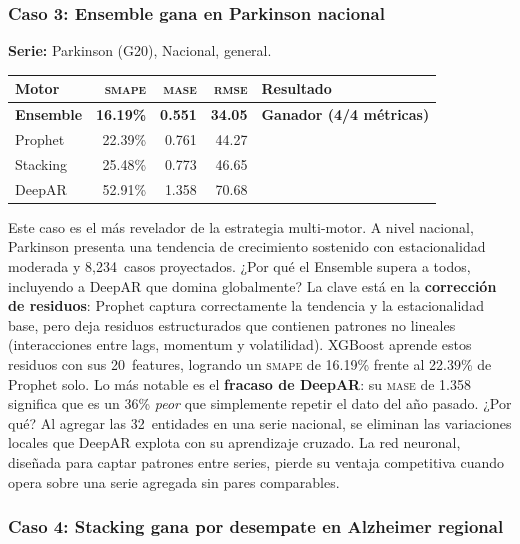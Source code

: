 \documentclass[12pt, letterpaper]{article}
\newcommand{\smape}{\textnormal{\textsc{smape}}}
\newcommand{\mase}{\textnormal{\textsc{mase}}}
\newcommand{\rmse}{\textnormal{\textsc{rmse}}}
\begin{document}
\subsubsection{Caso 3: Ensemble gana en Parkinson nacional}

\textbf{Serie:} Parkinson (G20), Nacional, general.

\begin{table}[H]
\centering
\small
\begin{tabularx}{\textwidth}{X r r r l}
\toprule
\textbf{Motor} & \textbf{\smape{}} & \textbf{\mase{}} & \textbf{\rmse{}} & \textbf{Resultado} \\
\midrule
\rowcolor{lightgreen} \textbf{Ensemble} & \textbf{16.19\%} & \textbf{0.551} & \textbf{34.05} & \textbf{Ganador (4/4 métricas)} \\
Prophet & 22.39\% & 0.761 & 44.27 & \\
Stacking & 25.48\% & 0.773 & 46.65 & \\
DeepAR & 52.91\% & 1.358 & 70.68 & \\
\bottomrule
\end{tabularx}
\end{table}

Este caso es el más revelador de la estrategia multi-motor. A nivel nacional, Parkinson presenta una tendencia de crecimiento sostenido con estacionalidad moderada y 8,234~casos proyectados. ¿Por qué el Ensemble supera a todos, incluyendo a DeepAR que domina globalmente? La clave está en la \textbf{corrección de residuos}: Prophet captura correctamente la tendencia y la estacionalidad base, pero deja residuos estructurados que contienen patrones no lineales (interacciones entre lags, momentum y volatilidad). XGBoost aprende estos residuos con sus 20~features, logrando un \smape{} de 16.19\% frente al 22.39\% de Prophet solo. Lo más notable es el \textbf{fracaso de DeepAR}: su \mase{} de 1.358 significa que es un 36\% \textit{peor} que simplemente repetir el dato del año pasado. ¿Por qué? Al agregar las 32~entidades en una serie nacional, se eliminan las variaciones locales que DeepAR explota con su aprendizaje cruzado. La red neuronal, diseñada para captar patrones entre series, pierde su ventaja competitiva cuando opera sobre una serie agregada sin pares comparables.

\subsubsection{Caso 4: Stacking gana por desempate en Alzheimer regional}
\end{document}
